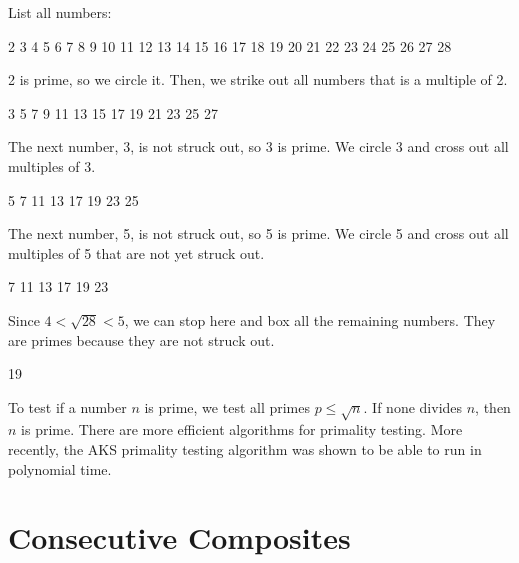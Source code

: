\begin{example}
    List all numbers:

    2 3 4 5 6 7 8 9 10 11 12 13 14 15 16 17 18 19 20 21 22 23 24 25 26 27 28

    2 is prime, so we circle it. Then, we strike out all numbers that is a multiple of 2.

     3  5  7  9  11  13  15  17  19  21  23  25  27 

    The next number, 3, is not struck out, so 3 is prime. We circle 3 and cross out all multiples of 3.

       5  7    11  13    17  19    23  25   

    The next number, 5, is not struck out, so 5 is prime. We circle 5 and cross out all multiples of 5 that are not yet struck out.

         7    11  13    17  19    23     

    Since $4 < \sqrt{28} < 5$, we can stop here and box all the remaining numbers. They are primes because they are not struck out.

                     19         
\end{example}

To test if a number $n$ is prime, we test all primes $p \leq \sqrt{n}$. If none divides $n$, then $n$ is prime. There are more efficient algorithms for primality testing. More recently, the AKS primality testing algorithm was shown to be able to run in polynomial time.

\section{Consecutive Composites}


